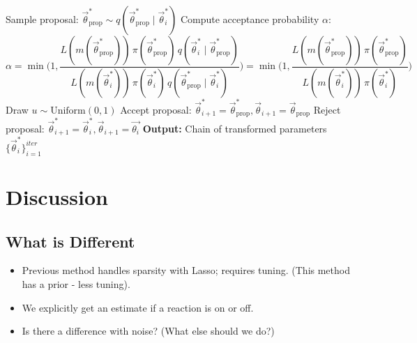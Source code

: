 \documentclass[pdflatex,sn-mathphys-num]{sn-jnl}%
\theoremstyle{thmstyleone}%
\theoremstyle{thmstyletwo}%
\theoremstyle{thmstylethree}%
\begin{document}
\begin{algorithm}[H]
\begin{algorithmic}[1]
    \State Sample proposal: $\overrightarrow{\theta}^*_{\text{prop}} \sim q(\overrightarrow{\theta}^*_{\text{prop}}  \mid \overrightarrow{ \theta}^*_i  )$ 
    \State Compute acceptance probability $\alpha$:
    \[
        \alpha = 
        \min\Bigg(
            1, 
            \frac{L(m(\overrightarrow{\theta}_{\text{prop}}^*)) \, \pi(\overrightarrow{\theta}_{\text{prop}}^*) \, q(\overrightarrow{\theta}_i^* \mid \overrightarrow{\theta}_{\text{prop}}^*)}
                 {L(m(\overrightarrow{\theta}_i^*)) \, \pi(\overrightarrow{\theta}_i^*) \, q(\overrightarrow{\theta}_{\text{prop}}^* \mid \overrightarrow{\theta}_i^*)}
        \Bigg)
        =
        \min\Bigg(
            1, 
            \frac{L(m(\overrightarrow{\theta}_{\text{prop}}^*)) \, \pi(\overrightarrow{\theta}_{\text{prop}}^*)}
                 {L(m(\overrightarrow{\theta}_i^*)) \, \pi(\overrightarrow{\theta}_i^*)}
        \Bigg)
    \]
    \State Draw $u \sim \text{Uniform}(0,1)$
        \State Accept proposal: $\overrightarrow{\theta}^*_{i+1}  = \overrightarrow{\theta}^*_{\text{prop}}, \overrightarrow{\theta}_{i+1} = \overrightarrow{\theta}_{\text{prop}}$
    \Else
        \State Reject proposal: $\overrightarrow{\theta}^*_{i+1}  = \overrightarrow{\theta}^*_i,\overrightarrow{ \theta}_{i+1}  = \overrightarrow{\theta_i}$
    \EndIf
\EndFor
\State \textbf{Output:} Chain of transformed parameters $\{\overrightarrow{\theta}^*_i\}_{i=1}^\textit{iter}$
\end{algorithmic}
\label{alg:MCMC}
\end{algorithm}




\section{Discussion}

\subsection*{What is Different}
\begin{itemize}
    \item Previous method handles sparsity with Lasso; requires tuning. (This method has a prior - less tuning).
    \item We explicitly get an estimate if a reaction is on or off.
    \item Is there a difference with noise? (What else should we do?)
\end{itemize}
\end{document}
